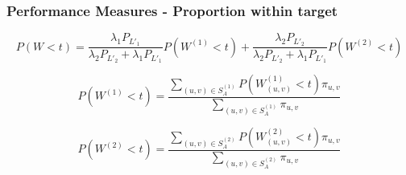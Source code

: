     
        
    
    


\begin{frame}
    \frametitle{Performance Measures - Proportion within target}
    \centering
    
    \small
    \begin{equation*}
        P(W < t) = \frac{\lambda_1 P_{L'_1}}{\lambda_2 P_{L'_2}+\lambda_1 P_{L'_1}} 
        P(W^{(1)} < t) + \frac{\lambda_2 P_{L'_2}}{\lambda_2 P_{L'_2} + 
        \lambda_1 P_{L'_1}}P(W^{(2)} < t) 
    \end{equation*}

    \begin{equation*}
        P(W^{(1)} < t) = \frac{\sum_{(u,v) \in S_A^{(1)}} P(W_{(u,v)}^{(1)} < t) 
        \pi_{u,v} }{\sum_{(u,v) \in S_A^{(1)}} \pi_{u,v}}
    \end{equation*}
    
    
    \begin{equation*}
        P(W^{(2)} < t) = \frac{\sum_{(u,v) \in S_A^{(2)}} P(W_{(u,v)}^{(2)} < t) 
        \pi_{u,v} }{\sum_{(u,v) \in S_A^{(2)}} \pi_{u,v}}
    \end{equation*}
    
\end{frame}


